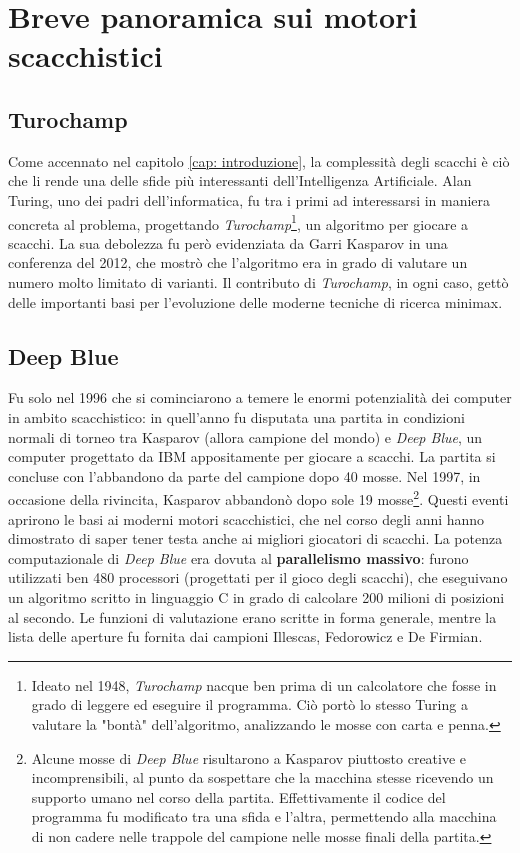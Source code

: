 \section{Breve panoramica sui motori scacchistici}
\subsection{Turochamp}
Come accennato nel capitolo \ref{cap: introduzione}, la complessità degli scacchi è ciò che li rende una delle sfide più interessanti 
dell'Intelligenza Artificiale. Alan Turing, uno dei padri dell'informatica, fu tra i primi ad interessarsi in maniera concreta al problema, progettando 
\textit{Turochamp}\footnote{Ideato nel 1948, \textit{Turochamp} nacque ben prima di un calcolatore che fosse in grado di 
leggere ed eseguire il programma. Ciò portò lo stesso Turing a valutare la "bontà" dell'algoritmo, analizzando le mosse con carta e penna.}, un algoritmo per giocare a scacchi\cite{godena2021eterna}.
La sua debolezza fu però evidenziata da Garri Kasparov in una conferenza del 2012, che mostrò che l'algoritmo era 
in grado di valutare un numero molto limitato di varianti\cite{kasparov2017reconstructing}. Il contributo di \textit{Turochamp}, in ogni caso, gettò delle importanti basi 
per l'evoluzione delle moderne tecniche di ricerca minimax.

\subsection{Deep Blue}
Fu solo nel 1996 che si cominciarono a temere le enormi potenzialità dei computer in ambito scacchistico: in quell'anno fu disputata 
una partita in condizioni normali di torneo tra Kasparov (allora campione del mondo) e \textit{Deep Blue}, un computer progettato 
da IBM appositamente per giocare a scacchi. La partita si concluse con l'abbandono da parte del campione dopo 40 mosse. Nel 1997, in occasione della rivincita, 
Kasparov abbandonò dopo sole 19 mosse\footnote{Alcune mosse di \textit{Deep Blue} risultarono a Kasparov piuttosto creative e incomprensibili,
al punto da sospettare che la macchina stesse ricevendo un supporto umano nel corso della partita. Effettivamente il codice del programma 
fu modificato tra una sfida e l'altra, permettendo alla macchina di non cadere nelle trappole del campione nelle mosse finali della partita.}. 
Questi eventi aprirono le basi ai moderni motori scacchistici, che nel corso degli anni hanno dimostrato di saper tener testa anche 
ai migliori giocatori di scacchi\cite{newborn2012kasparov}.
La potenza computazionale di \textit{Deep Blue} era dovuta al \textbf{parallelismo massivo}: furono utilizzati ben 480 processori (progettati per il gioco degli 
scacchi), che eseguivano un algoritmo scritto in linguaggio C in grado di calcolare 200 milioni di posizioni al secondo. Le funzioni di 
valutazione erano scritte in forma generale, mentre la lista delle aperture fu fornita dai campioni Illescas, Fedorowicz e De Firmian.

